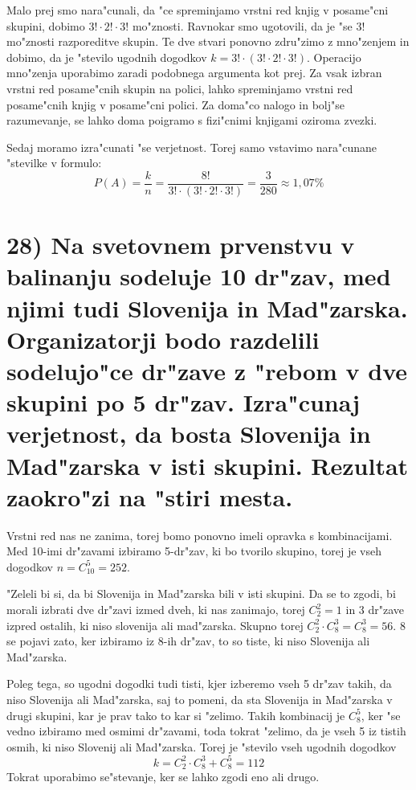 \documentclass[a4paper, 12pt]{article}
\begin{document}
Malo prej smo nara"cunali, da "ce spreminjamo vrstni red knjig v posame"cni skupini, dobimo $3!\cdot 2!\cdot 3!$ mo"znosti. Ravnokar smo ugotovili, da je "se $3!$ mo"znosti razporeditve skupin. Te dve stvari ponovno zdru"zimo z mno"zenjem in dobimo, da je "stevilo ugodnih dogodkov $k = 3! \cdot (3! \cdot 2! \cdot 3!)$. Operacijo mno"zenja uporabimo zaradi podobnega argumenta kot prej. Za vsak izbran vrstni red posame"cnih skupin na polici, lahko spreminjamo vrstni red posame"cnih knjig v posame"cni polici. Za doma"co nalogo in bolj"se razumevanje, se lahko doma poigramo s fizi"cnimi knjigami oziroma zvezki.

Sedaj moramo izra"cunati "se verjetnost. Torej samo vstavimo nara"cunane "stevilke v formulo:
\begin{equation*}
P(A) = \dfrac{k}{n} = \dfrac{8!}{3! \cdot (3! \cdot 2! \cdot 3!)} = \dfrac{3}{280} \approx 1,07\%
\end{equation*}

\section*{28) Na svetovnem prvenstvu v balinanju sodeluje 10 dr"zav, med njimi tudi Slovenija in Mad"zarska. Organizatorji bodo razdelili sodelujo"ce dr"zave z "rebom v dve skupini po 5 dr"zav. Izra"cunaj verjetnost, da bosta Slovenija in Mad"zarska v isti skupini. Rezultat zaokro"zi na "stiri mesta.}
Vrstni red nas ne zanima, torej bomo ponovno imeli opravka s kombinacijami. Med 10-imi dr"zavami izbiramo 5-dr"zav, ki bo tvorilo skupino, torej je vseh dogodkov $n = C_{10}^5 = 252$. 

"Zeleli bi si, da bi Slovenija in Mad"zarska bili v isti skupini. Da se to zgodi, bi morali izbrati dve dr"zavi izmed dveh, ki nas zanimajo, torej $C_2^2 = 1$ in 3 dr"zave izpred ostalih, ki niso slovenija ali mad"zarska. Skupno torej $C_2^2 \cdot C_8^3 = C_8^3 = 56$. 8 se pojavi zato, ker izbiramo iz 8-ih dr"zav, to so tiste, ki niso Slovenija ali Mad"zarska.

Poleg tega, so ugodni dogodki tudi tisti, kjer izberemo vseh 5 dr"zav takih, da niso Slovenija ali Mad"zarska, saj to pomeni, da sta Slovenija in Mad"zarska v drugi skupini, kar je prav tako to kar si "zelimo. Takih kombinacij je $C_8^5$, ker "se vedno izbiramo med osmimi dr"zavami, toda tokrat "zelimo, da je vseh 5 iz tistih osmih, ki niso Slovenij ali Mad"zarska. Torej je "stevilo vseh ugodnih dogodkov
\begin{equation*}
k = C_2^2 \cdot C_8^3 + C_8^5 = 112
\end{equation*}
Tokrat uporabimo se"stevanje, ker se lahko zgodi eno ali drugo.
\end{document}
